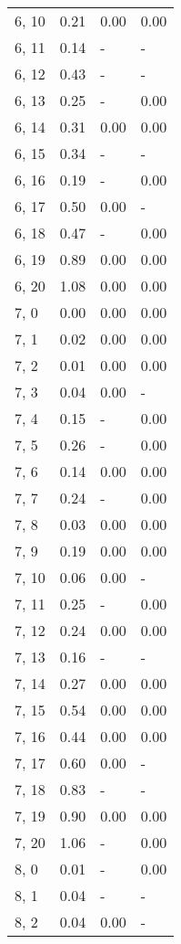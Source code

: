 \begin{table}
\begin{tabular}{llll}
6, 10  &    0.21 &  0.00 &  0.00 \\
6, 11  &    0.14 &     - &     - \\
6, 12  &    0.43 &     - &     - \\
6, 13  &    0.25 &     - &  0.00 \\
6, 14  &    0.31 &  0.00 &  0.00 \\
6, 15  &    0.34 &     - &     - \\
6, 16  &    0.19 &     - &  0.00 \\
6, 17  &    0.50 &  0.00 &     - \\
6, 18  &    0.47 &     - &  0.00 \\
6, 19  &    0.89 &  0.00 &  0.00 \\
6, 20  &    1.08 &  0.00 &  0.00 \\
7, 0   &    0.00 &  0.00 &  0.00 \\
7, 1   &    0.02 &  0.00 &  0.00 \\
7, 2   &    0.01 &  0.00 &  0.00 \\
7, 3   &    0.04 &  0.00 &     - \\
7, 4   &    0.15 &     - &  0.00 \\
7, 5   &    0.26 &     - &  0.00 \\
7, 6   &    0.14 &  0.00 &  0.00 \\
7, 7   &    0.24 &     - &  0.00 \\
7, 8   &    0.03 &  0.00 &  0.00 \\
7, 9   &    0.19 &  0.00 &  0.00 \\
7, 10  &    0.06 &  0.00 &     - \\
7, 11  &    0.25 &     - &  0.00 \\
7, 12  &    0.24 &  0.00 &  0.00 \\
7, 13  &    0.16 &     - &     - \\
7, 14  &    0.27 &  0.00 &  0.00 \\
7, 15  &    0.54 &  0.00 &  0.00 \\
7, 16  &    0.44 &  0.00 &  0.00 \\
7, 17  &    0.60 &  0.00 &     - \\
7, 18  &    0.83 &     - &     - \\
7, 19  &    0.90 &  0.00 &  0.00 \\
7, 20  &    1.06 &     - &  0.00 \\
8, 0   &    0.01 &     - &  0.00 \\
8, 1   &    0.04 &     - &     - \\
8, 2   &    0.04 &  0.00 &     - \\

\end{tabular}
\end{table}
